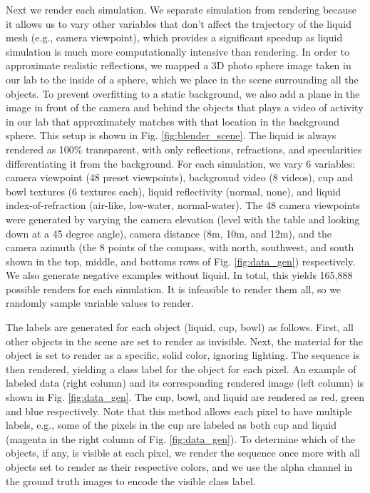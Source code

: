 \documentclass[runningheads,a4paper]{llncs}
\begin{document}
Next we render each simulation. 
We separate simulation from rendering because it allows us to vary other variables that don't affect the trajectory of the liquid mesh (e.g., camera viewpoint), which provides a significant speedup as liquid simulation is much more computationally intensive than rendering. 
In order to approximate realistic reflections, we mapped a 3D photo sphere image taken in our lab to the inside of a sphere, which we place in the scene surrounding all the objects. 
To prevent overfitting to a static background, we also add a plane in the image in front of the camera and behind the objects that plays a video of activity in our lab that approximately matches with that location in the background sphere. 
This setup is shown in Fig. \ref{fig:blender_scene}.
The liquid is always rendered as 100\% transparent, with only reflections, refractions, and specularities differentiating it from the background. 
For each simulation, we vary 6 variables: camera viewpoint (48 preset viewpoints), background video (8 videos), cup and bowl textures (6 textures each), liquid reflectivity (normal, none), and liquid index-of-refraction (air-like, low-water, normal-water). 
The 48 camera viewpoints were generated by varying the camera elevation (level with the table and looking down at a 45 degree angle), camera distance (8m, 10m, and 12m), and the camera azimuth (the 8 points of the compass, with north, southwest, and south shown in the top, middle, and bottoms rows of Fig. \ref{fig:data_gen}) respectively. 
We also generate negative examples without liquid. 
In total, this yields 165,888 possible renders for each simulation. 
It is infeasible to render them all, so we randomly sample variable values to render.

The labels are generated for each object (liquid, cup, bowl) as follows.
First, all other objects in the scene are set to render as invisible.
Next, the material for the object is set to render as a specific, solid color, ignoring lighting.
The sequence is then rendered, yielding a class label for the object for each pixel.
An example of labeled data (right column) and its corresponding rendered image (left column) is shown in Fig. \ref{fig:data_gen}. 
The cup, bowl, and liquid are rendered as red, green and blue respectively.
Note that this method allows each pixel to have multiple labels, e.g., some of the pixels in the cup are labeled as both cup and liquid (magenta in the right column of Fig. \ref{fig:data_gen}).
To determine which of the objects, if any, is visible at each pixel, we render the sequence once more with all objects set to render as their respective colors, and we use the alpha channel in the ground truth images to encode the visible class label. 
\end{document}
